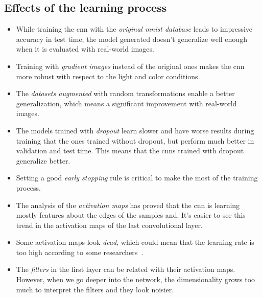 \subsection*{Effects of the learning process}
\begin{itemize}
	\item While training the \gls{cnn} with the \emph{original \gls{mnist} database} leads to impressive accuracy in test time, the model generated doesn't generalize well enough when it is evaluated with real-world images.
	\item Training with \emph{gradient images} instead of the original ones makes the \gls{cnn} more robust with respect to the light and color conditions.
	\item The \emph{datasets augmented} with random transformations enable a better generalization, which means a significant improvement with real-world images.
	\item The models trained with \emph{dropout} learn slower and have worse results during training that the ones trained without dropout, but perform much better in validation and test time. This means that the \glspl{cnn} trained with dropout generalize better. 
	\item Setting a good \emph{early stopping} rule is critical to make the most of the training process. 
	\item The analysis of the \emph{activation maps} has proved that the \gls{cnn} is learning mostly features about the edges of the samples and. It's easier to see this trend in the activation maps of the last convolutional layer.
	\item Some activation maps look \textit{dead}, which could mean that the learning rate is too high according to some researchers~\cite{cs231n}.
	\item The \emph{filters} in the first layer can be related with their activation maps. However, when we go deeper into the network, the dimensionality grows too much to interpret the filters and they look noisier. 
\end{itemize}

